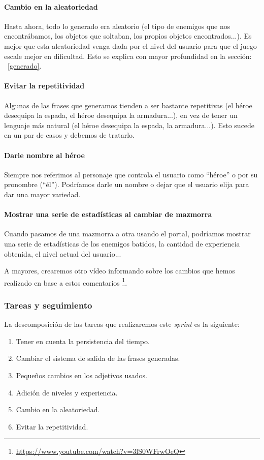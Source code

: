 \paragraph{Cambio en la aleatoriedad} Hasta ahora, todo lo generado era aleatorio (el tipo de enemigos que nos encontrábamos, los objetos que soltaban, los propios objetos encontrados...). Es mejor que esta aleatoriedad venga dada por el nivel del usuario para que el juego escale mejor en dificultad. Esto se explica con mayor profundidad en la sección: ~\ref{generado}.

\paragraph{Evitar la repetitividad} Algunas de las frases que generamos tienden a ser bastante repetitivas (el héroe desequipa la espada, el héroe desequipa la armadura...), en vez de tener un lenguaje más natural (el héroe desequipa la espada, la armadura...). Esto sucede en un par de casos y debemos de tratarlo.

\paragraph{Darle nombre al héroe} Siempre nos referimos al personaje que controla el usuario como ``héroe'' o por su pronombre (``él''). Podríamos darle un nombre o dejar que el usuario elija para dar una mayor variedad.

\paragraph{Mostrar una serie de estadísticas al cambiar de mazmorra} Cuando pasamos de una mazmorra a otra usando el portal, podríamos mostrar una serie de estadísticas de los enemigos batidos, la cantidad de experiencia obtenida, el nivel actual del usuario...

A mayores, crearemos otro vídeo informando sobre los cambios que hemos realizado en base a estos comentarios \footnote{\url{https://www.youtube.com/watch?v=3lS0WFrwOeQ}}.

\subsubsection{Tareas y seguimiento}

La descomposición de las tareas que realizaremos este \textit{sprint} es la siguiente:

\begin{enumerate}[label=\bfseries WBS 8.\arabic*]
  \item Tener en cuenta la persistencia del tiempo.
  \item Cambiar el sistema de salida de las frases generadas.
  \item Pequeños cambios en los adjetivos usados.
  \item Adición de niveles y experiencia.
  \item Cambio en la aleatoriedad.
  \item Evitar la repetitividad.
\end{enumerate}

